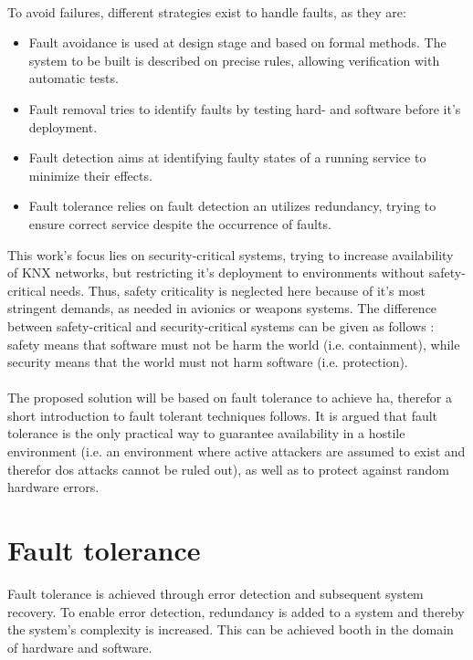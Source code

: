 \\
To avoid failures, different strategies exist to handle faults, as they are:
\begin{itemize}
 \item Fault avoidance is used at design stage and based on formal methods. The system to be built is described on precise rules, allowing verification with 
 automatic tests.
 \item Fault removal tries to identify faults by testing hard- and software before it's deployment.
 \item Fault detection aims at identifying faulty states of a running service to minimize their effects.
 \item Fault tolerance relies on fault detection an utilizes redundancy, trying to ensure correct service despite the occurrence of faults. 
\end{itemize}
This work's focus lies on security-critical systems, trying to increase availability of KNX networks, but restricting it's
deployment to environments without safety-critical needs. Thus, safety criticality is neglected here because of it's most stringent demands, as needed in
avionics or weapons systems.
The difference between safety-critical and security-critical systems can be given as follows \cite{5784222}: safety means that software must not be harm the 
world (i.e. containment), while security means that the world must not harm software (i.e. protection). 
\\
\\
The proposed solution will be based on fault tolerance to achieve \gls{ha}, therefor a short introduction to fault tolerant techniques follows.
It is argued that fault tolerance is the only practical way to guarantee availability
in a hostile environment (i.e. an environment where active attackers are assumed to exist and therefor \gls{dos} attacks cannot be ruled out), as well as to
protect against random hardware errors.

\section{Fault tolerance}
Fault tolerance is achieved through error detection and subsequent system recovery. To enable error detection, redundancy is added to a system and thereby the 
system's complexity is increased. This can be achieved booth in the domain of hardware
and software. 

